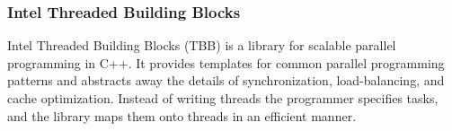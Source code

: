 
\subsubsection{Intel Threaded Building Blocks}
Intel Threaded Building Blocks \cite{reinders2007intel} (TBB) is a library for
scalable parallel
programming in C++. It provides templates for common parallel programming
patterns and abstracts away the details of synchronization, load-balancing,
and cache optimization. Instead of writing threads the programmer specifies
tasks, and the library maps them onto threads in an efficient manner.